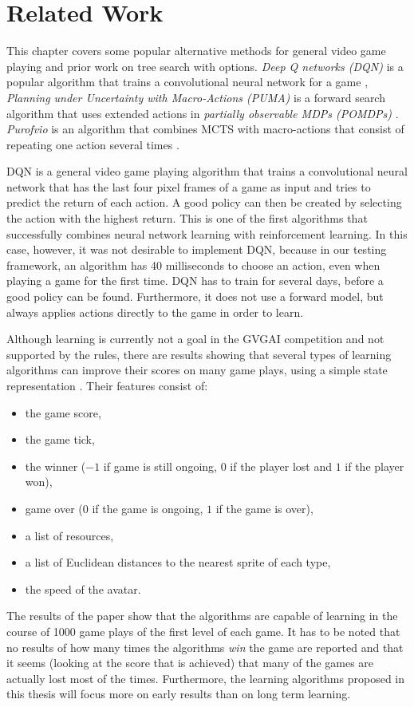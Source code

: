 \chapter{Related Work}
\label{sec:related}
This chapter covers some popular alternative methods for general video game
playing and prior work on tree search with options. \emph{Deep Q networks (DQN)}
is a popular algorithm that trains a convolutional neural network for a game
\cite{mnih2013playing}, \emph{Planning under Uncertainty with Macro-Actions
(PUMA)} is a forward search algorithm that uses extended actions in
\emph{partially observable MDPs (POMDPs)} \cite{he2010puma}.  \emph{Purofvio} is
an algorithm that combines MCTS with macro-actions that consist of repeating one
action several times \cite{powley2012monte}. 

DQN is a general video game playing algorithm that trains a convolutional neural
network that has the last four pixel frames of a game as input and tries to
predict the return of each action. A good policy can then be created by
selecting the action with the highest return. This is one of the first
algorithms that successfully combines neural network learning with reinforcement
learning. In this case, however, it was not desirable to implement DQN, because
in our testing framework, an algorithm has 40 milliseconds to choose an action,
even when playing a game for the first time. DQN has to train for several days,
before a good policy can be found.  Furthermore, it does not use a forward
model, but always applies actions directly to the game in order to learn.

Although learning is currently not a goal in the GVGAI competition and not
supported by the rules, there are results showing that several types of learning
algorithms can improve their scores on many game plays, using a simple state
representation \cite{samothrakis2015neuroevolution}. Their features consist
of: 
\begin{itemize}%
	\item the game score, 
	\item the game tick,
	\item the winner ($-1$ if game is still ongoing, $0$ if the player lost and
		$1$ if the player won), 
	\item game over ($0$ if the game is ongoing, $1$ if the game is over), 
	\item a list of resources, 
	\item a list of Euclidean distances to the nearest sprite of each type,
	\item the speed of the avatar. 
\end{itemize}
The results of the paper show that the algorithms are capable of learning in the
course of 1000 game plays of the first level of each game. It has to be noted
that no results of how many times the algorithms \emph{win} the game are
reported and that it seems (looking at the score that is achieved) that many of
the games are actually lost most of the times. Furthermore, the learning
algorithms proposed in this thesis will focus more on early results than on long
term learning.

